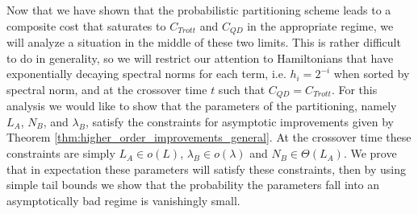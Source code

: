 Now that we have shown that the probabilistic partitioning scheme leads to a composite cost that saturates to $C_{Trott}$ and $C_{QD}$ in the appropriate regime, we will analyze a situation in the middle of these two limits. This is rather difficult to do in generality, so we will restrict our attention to Hamiltonians that have exponentially decaying spectral norms for each term, i.e. $h_i = 2^{-i}$ when sorted by spectral norm, and at the crossover time $t$ such that $C_{QD} = C_{Trott}$. For this analysis we would like to show that the parameters of the partitioning, namely $L_A$, $N_B$, and $\lambda_B$, satisfy the constraints for asymptotic improvements given by Theorem \ref{thm:higher_order_improvements_general}. At the crossover time these constraints are simply $L_A \in o(L)$, $\lambda_B \in o(\lambda)$ and $N_B \in \Theta(L_A)$. We prove that in expectation these parameters will satisfy these constraints, then by using simple tail bounds we show that the probability the parameters fall into an asymptotically bad regime is vanishingly small.

